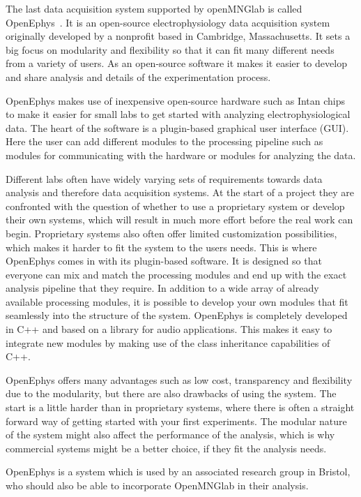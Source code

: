 The last data acquisition system supported by openMNGlab is called OpenEphys~\cite{openEphys}. It is an open-source electrophysiology data acquisition system originally developed by a nonprofit based in Cambridge, Massachusetts. It sets a big focus on modularity and flexibility so that it can fit many different needs from a variety of users. As an open-source software it makes it easier to develop and share analysis and details of the experimentation process.

OpenEphys makes use of inexpensive open-source hardware such as Intan chips~\cite{openEphys} to make it easier for small labs to get started with analyzing electrophysiological data. The heart of the software is a plugin-based graphical user interface (GUI). Here the user can add different modules to the processing pipeline such as modules for communicating with the hardware or modules for analyzing the data.

Different labs often have widely varying sets of requirements towards data analysis and therefore data acquisition systems. At the start of a project they are confronted with the question of whether to use a proprietary system or develop their own systems, which will result in much more effort before the real work can begin. Proprietary systems also often offer limited customization possibilities, which makes it harder to fit the system to the users needs. This is where OpenEphys comes in with its plugin-based software. It is designed so that everyone can mix and match the processing modules and end up with the exact analysis pipeline that they require. In addition to a wide array of already available processing modules, it is possible to develop your own modules that fit seamlessly into the structure of the system. OpenEphys is completely developed in C++ and based on a library for audio applications. This makes it easy to integrate new modules by making use of the class inheritance capabilities of C++.

OpenEphys offers many advantages such as low cost, transparency and flexibility due to the modularity, but there are also drawbacks of using the system. The start is a little harder than in proprietary systems, where there is often a straight forward way of getting started with your first experiments. The modular nature of the system might also affect the performance of the analysis, which is why commercial systems might be a better choice, if they fit the analysis needs.

OpenEphys is a system which is used by an associated research group in Bristol, who should also be able to incorporate OpenMNGlab in their analysis.

